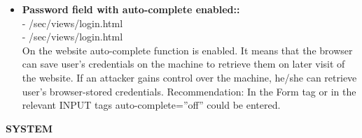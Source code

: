 \begin{itemize}
\item \textbf{Password field with auto-complete enabled::}\\
- /sec/views/login.html\\
- /sec/views/login.html\\

On the website auto-complete function is enabled. It means that the browser can save user's credentials on the machine to retrieve them on later visit of the website. If an attacker gains control over the machine, he/she can retrieve user’s browser-stored credentials. 
Recommendation: In the Form tag or in the relevant INPUT tags auto-complete=”off” could be entered.

\end{itemize}

\begin{center}
\textbf{SYSTEM}
\end{center}

